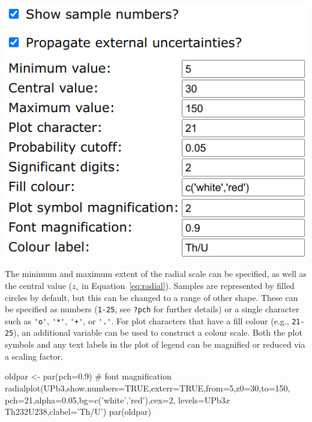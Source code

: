 \begin{refsection}
\begin{enumerate}
\noindent\begin{minipage}[t]{.45\linewidth}
\strut\vspace*{-\baselineskip}\newline
\includegraphics[width=\linewidth]{../figures/UPbRadialOtherOptions.png}
\end{minipage}
\begin{minipage}[t]{.55\linewidth}
  The minimum and maximum extent of the radial scale can be specified,
  as well as the central value ($z_\circ$ in
  Equation~\ref{eq:radial}). Samples are represented by filled circles
  by default, but this can be changed to a range of other shape. These
  can be specified as numbers (\texttt{1-25}, see \texttt{?pch} for
  further details) or a single character such as \verb|'o'|,
  \verb|'*'|, \verb|'+'|, or \verb|'.'|. For plot characters that have
  a fill colour (e.g., \texttt{21-25}), an additional variable can be
  used to construct a colour scale. Both the plot symbols and any text
  labels in the plot of legend can be magnified or reduced via a
  scaling factor.
\end{minipage}

\begin{script}
oldpar <- par(pch=0.9) # font magnification
radialplot(UPb3,show.numbers=TRUE,exterr=TRUE,from=5,z0=30,to=150,
           pch=21,alpha=0.05,bg=c('white','red'),cex=2,
           levels=UPb3$x$Th232U238,clabel='Th/U')
par(oldpar)
\end{script}

\end{enumerate}


\end{refsection}
